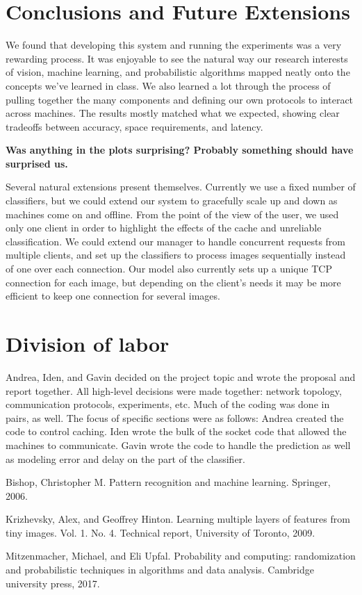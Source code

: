 \documentclass[12pt]{article}
\begin{document}
\section{Conclusions and Future Extensions}

We found that developing this system and running the experiments was a very rewarding process.
It was enjoyable to see the natural way our research interests of vision, machine learning, and probabilistic algorithms mapped neatly onto the concepts we've learned in class.
We also learned a lot through the process of pulling together the many components and defining our own protocols to interact across machines.
The results mostly matched what we expected, showing clear tradeoffs between accuracy, space requirements, and latency.

{\bf Was anything in the plots surprising?
Probably something should have surprised us.}

Several natural extensions present themselves.
Currently we use a fixed number of classifiers, but we could extend our system to gracefully scale up and down as machines come on and offline.
From the point of the view of the user, we used only one client in order to highlight the effects of the cache and unreliable classification.
We could extend our manager to handle concurrent requests from multiple clients, and set up the classifiers to process images sequentially instead of one over each connection.
Our model also currently sets up a unique TCP connection for each image, but depending on the client's needs it may be more efficient to keep one connection for several images.

\section{Division of labor}

Andrea, Iden, and Gavin decided on the project topic and wrote the proposal and report together.
All high-level decisions were made together: network topology, communication protocols, experiments, etc.
Much of the coding was done in pairs, as well.
The focus of specific sections were as follows: Andrea created the code to control caching.
Iden wrote the bulk of the socket code that allowed the machines to communicate.
Gavin wrote the code to handle the prediction as well as modeling error and delay on the part of the classifier.


\footnotesize\begin{thebibliography}{1}
    Bishop, Christopher M. Pattern recognition and machine learning. Springer, 2006.

    Krizhevsky, Alex, and Geoffrey Hinton. Learning multiple layers of features from tiny images. Vol. 1. No. 4. Technical report, University of Toronto, 2009.

    Mitzenmacher, Michael, and Eli Upfal. Probability and computing: randomization and probabilistic techniques in algorithms and data analysis. Cambridge university press, 2017.

\end{thebibliography}
\end{document}
